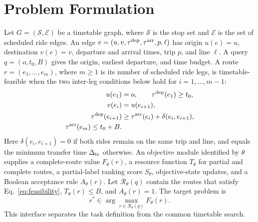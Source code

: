 \section{Problem Formulation}
Let \(G=(\mathcal{S},\mathcal{E})\) be a timetable graph, where \(\mathcal S\)
is the stop set and \(\mathcal E\) is the set of scheduled ride edges. An edge
\(e=(u,v,\tau^{\rm dep},\tau^{\rm arr},p,\ell)\) has origin \(u(e)=u\),
destination \(v(e)=v\), departure and arrival times, trip \(p\), and line
\(\ell\). A query \(q=(o,t_0,B)\) gives the origin, earliest departure, and time
budget. A route \(r=(e_1,\ldots,e_m)\), where \(m\geq1\) is its number of
scheduled ride legs, is timetable-feasible when the two inter-leg conditions
below hold for \(i=1,\ldots,m-1\):
\begin{equation}
    \label{eq:feasibility}
    \begin{aligned}
        u(e_1)&=o,\qquad \tau^{\rm dep}(e_1)\ge t_0,\\
        v(e_i)&=u(e_{i+1}),\\
        \tau^{\rm dep}(e_{i+1})&\ge\tau^{\rm arr}(e_i)+\delta(e_i,e_{i+1}),\\
        \tau^{\rm arr}(e_m)\le t_0+B .
    \end{aligned}
\end{equation}
Here \(\delta(e_i,e_{i+1})=0\) if both rides remain on the same trip and line,
and equals the minimum transfer time \(\Delta_{\rm tr}\) otherwise. An objective module
identified by \(\theta\) supplies a complete-route value \(F_\theta(r)\), a
resource function
\(T_\theta\) for partial and complete routes, a partial-label ranking score
\(S_\theta\), objective-state updates, and a Boolean acceptance rule
\(A_\theta(r)\). Let \(\mathcal R_\theta(q)\) contain the routes that satisfy
Eq.~\ref{eq:feasibility}, \(T_\theta(r)\leq B\), and \(A_\theta(r)=1\). The
target problem is
\begin{equation}
    \label{eq:target_problem}
    r^*\in\arg\max_{r\in\mathcal R_\theta(q)}F_\theta(r).
\end{equation}
This interface separates the task definition from the common timetable search.

